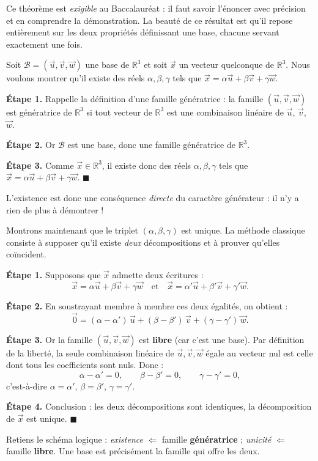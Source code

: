 \documentclass[11pt]{article}
\begin{document}
Ce théorème est \emph{exigible} au Baccalauréat : il faut savoir l'énoncer avec précision et en comprendre la démonstration. La beauté de ce résultat est qu'il repose entièrement sur les deux propriétés définissant une base, chacune servant exactement une fois.

\begin{experience}
Soit $\mathcal{B} = (\vec{u}, \vec{v}, \vec{w})$ une base de $\mathbb{R}^3$ et soit $\vec{x}$ un vecteur quelconque de $\mathbb{R}^3$. Nous voulons montrer qu'il existe des réels $\alpha, \beta, \gamma$ tels que $\vec{x} = \alpha \vec{u} + \beta \vec{v} + \gamma \vec{w}$.

\textbf{Étape 1.} Rappelle la définition d'une famille génératrice : la famille $(\vec{u}, \vec{v}, \vec{w})$ est génératrice de $\mathbb{R}^3$ si tout vecteur de $\mathbb{R}^3$ est une combinaison linéaire de $\vec{u}$, $\vec{v}$, $\vec{w}$.

\textbf{Étape 2.} Or $\mathcal{B}$ est une base, donc une famille génératrice de $\mathbb{R}^3$.

\textbf{Étape 3.} Comme $\vec{x} \in \mathbb{R}^3$, il existe donc des réels $\alpha, \beta, \gamma$ tels que $\vec{x} = \alpha \vec{u} + \beta \vec{v} + \gamma \vec{w}$. \hfill $\blacksquare$

L'existence est donc une conséquence \emph{directe} du caractère générateur : il n'y a rien de plus à démontrer !
\end{experience}

\begin{experience}
Montrons maintenant que le triplet $(\alpha, \beta, \gamma)$ est unique. La méthode classique consiste à supposer qu'il existe \emph{deux} décompositions et à prouver qu'elles coïncident.

\textbf{Étape 1.} Supposons que $\vec{x}$ admette deux écritures :
\[ \vec{x} = \alpha \vec{u} + \beta \vec{v} + \gamma \vec{w} \quad \text{et} \quad \vec{x} = \alpha' \vec{u} + \beta' \vec{v} + \gamma' \vec{w}. \]

\textbf{Étape 2.} En soustrayant membre à membre ces deux égalités, on obtient :
\[ \vec{0} = (\alpha - \alpha')\,\vec{u} + (\beta - \beta')\,\vec{v} + (\gamma - \gamma')\,\vec{w}. \]

\textbf{Étape 3.} Or la famille $(\vec{u}, \vec{v}, \vec{w})$ est \textbf{libre} (car c'est une base). Par définition de la liberté, la seule combinaison linéaire de $\vec{u}, \vec{v}, \vec{w}$ égale au vecteur nul est celle dont tous les coefficients sont nuls. Donc :
\[ \alpha - \alpha' = 0, \qquad \beta - \beta' = 0, \qquad \gamma - \gamma' = 0, \]
c'est-à-dire $\alpha = \alpha'$, $\beta = \beta'$, $\gamma = \gamma'$.

\textbf{Étape 4.} Conclusion : les deux décompositions sont identiques, la décomposition de $\vec{x}$ est unique. \hfill $\blacksquare$

Retiens le schéma logique : \emph{existence} $\Leftarrow$ famille \textbf{génératrice} ; \emph{unicité} $\Leftarrow$ famille \textbf{libre}. Une base est précisément la famille qui offre les deux.
\end{experience}
\end{document}

